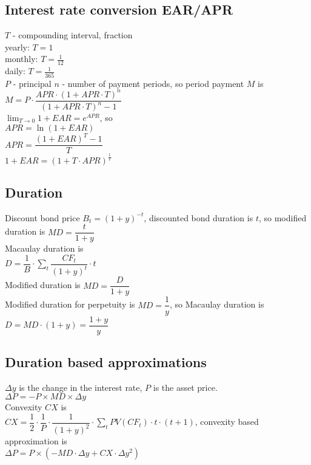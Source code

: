 \subsection*{Interest rate conversion EAR/APR}
$T$ - compounding interval, fraction \\
yearly: $T = 1$ \\
monthly: $T = \frac{1}{12}$ \\
daily: $T = \frac{1}{365}$ \\
$P$ - principal
$n$ - number of payment periods, so period payment $M$ is \\
$M = P\cdot \dfrac{APR\cdot (1+APR\cdot T)^n}{(1+APR\cdot T)^n - 1}$ \\
$\lim_{T\to 0} 1 + EAR = e^{APR}$, so \\ $APR = \ln(1+EAR)$ \\
$APR = \dfrac{(1+EAR)^T - 1}{T}$ \\
$1+EAR = (1+T\cdot APR)^{\frac{1}{T}}$ \\
\subsection*{Duration}
Discount bond price $B_t = (1+y)^{-t}$, discounted bond duration is $t$, so modified duration is $MD = \dfrac{t}{1+y}$ \\
Macaulay duration is \\ $D = \dfrac{1}{B}\cdot \sum_t \dfrac{CF_t}{(1+y)^t} \cdot t$\\
Modified duration is $MD = \dfrac{D}{1+y}$\\
Modified duration for perpetuity is $MD = \dfrac{1}{y}$, so Macaulay duration is $D=MD\cdot (1+y) = \dfrac{1+y}{y}$
\subsection*{Duration based approximations}
$\Delta{y}$ is the change in the interest rate, $P$ is the asset price. \\
$\Delta{P} = -P\times MD\times \Delta{y}$ \\
Convexity $CX$ is \\
$CX = \dfrac{1}{2}\cdot \dfrac{1}{P}\cdot \dfrac{1}{(1+y)^2} \cdot \sum_{t} PV(CF_t) \cdot t \cdot (t+1)$, convexity based approximation is\\
$\Delta{P} = P\times (-MD \cdot \Delta{y} + CX\cdot \Delta{y}^2)$

